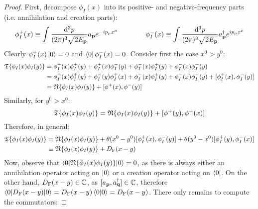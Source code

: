 \begin{proofbox}
  \begin{proof}
    First, decompose $ \phi_I(x) $ into its positive- and negative-frequency parts (i.e. annihilation and creation parts):
    \begin{equation*}
      \phi_I^+(x) \equiv \int \frac{\mathrm{d}^3p}{(2\pi)^3 \sqrt{2E_{\mathbf{p}}}} a_{\mathbf{p}} e^{-i p_\mu x^\mu}
      \qquad \qquad
      \phi_I^-(x) \equiv \int \frac{\mathrm{d}^3p}{(2\pi)^3 \sqrt{2E_{\mathbf{p}}}} a_{\mathbf{p}}^\dagger e^{i p_\mu x^\mu}
    \end{equation*}
    Clearly $ \phi_I^+(x) \ket{0} = 0 $ and $ \bra{0} \phi_I^-(x) = 0 $. Consider first the case $ x^0 > y^0 $:
    \begin{equation*}
      \begin{split}
        \mathfrak{T}\{\phi_I(x) \phi_I(y)\}
        & = \phi_I^+(x) \phi_I^+(y) + \phi_I^+(x) \phi_I^-(y) + \phi_I^-(x) \phi_I^+(y) + \phi_I^-(x) \phi_I^-(y) \\
        & = \phi_I^+(x) \phi_I^+(y) + \phi_I^-(y) \phi_I^+(x) + \phi_I^-(x) \phi_I^+(y) + \phi_I^-(x) \phi_I^-(y) + [\phi_I^+(x) , \phi_I^-(y)] \\
        & = \mathfrak{N}\{\phi_I(x) \phi_I(y)\} + [\phi^+(x) , \phi^-(y)]
      \end{split}
    \end{equation*}
    Similarly, for $ y^0 > x^0 $:
    \begin{equation*}
      \mathfrak{T}\{\phi_I(x) \phi_I(y)\} = \mathfrak{N}\{\phi_I(x) \phi_I(y)\} + [\phi^+(y) , \phi^-(x)]
    \end{equation*}
    Therefore, in general:
    \begin{equation*}
      \begin{split}
        \mathfrak{T}\{\phi_I(x) \phi_I(y)\}
        & = \mathfrak{N}\{\phi_I(x) \phi_I(y)\} + \theta(x^0 - y^0) [\phi_I^+(x) , \phi_I^-(y)] + \theta(y^0 - x^0) [\phi_I^+(y) , \phi_I^-(x)] \\
        & \equiv \mathfrak{N}\{\phi_I(x) \phi_I(y)\} + D_\text{F}(x-y)
      \end{split}
    \end{equation*}
    Now, observe that $ \braket{0 | \mathfrak{N}\{\phi_I(x) \phi_I(y)\} | 0} = 0 $, as there is always either an annihilation operator acting on $ \ket{0} $ or a creation operator acting on $ \bra{0} $. On the other hand, $ D_\text{F}(x-y) \in \mathbb{C} $, as $ [a_{\mathbf{p}} , a^\dagger_{\mathbf{q}}] \in \mathbb{C} $, therefore $ \braket{0 | D_\text{F}(x-y) | 0} = D_\text{F}(x-y) \braket{0 | 0} = D_\text{F}(x-y) $. There only remains to compute the commutators:

\end{proof}
\end{proofbox}
